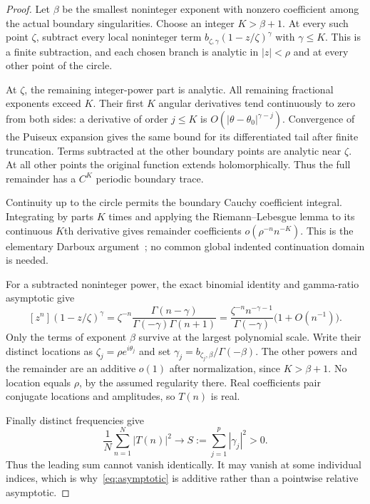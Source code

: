 \documentclass[11pt,a4paper]{article}
\theoremstyle{remark}\newtheorem*{ednote}{Editorial note (ProveIt, 2026-10-01)}
\begin{document}
\begin{proof}
Let $\beta$ be the smallest noninteger exponent with nonzero coefficient among the actual boundary singularities. Choose an integer $K>\beta+1$. At every such point $\zeta$, subtract every local noninteger term
$b_{\zeta,\gamma}(1-z/\zeta)^\gamma$ with $\gamma\le K$. This is a finite subtraction, and each chosen branch is analytic in $|z|<\rho$ and at every other point of the circle.

At $\zeta$, the remaining integer-power part is analytic. All remaining fractional exponents exceed $K$. Their first $K$ angular derivatives tend continuously to zero from both sides: a derivative of order $j\le K$ is $O(|\theta-\theta_0|^{\gamma-j})$. Convergence of the Puiseux expansion gives the same bound for its differentiated tail after finite truncation. Terms subtracted at the other boundary points are analytic near $\zeta$. At all other points the original function extends holomorphically. Thus the full remainder has a $C^K$ periodic boundary trace.

Continuity up to the circle permits the boundary Cauchy coefficient integral. Integrating by parts $K$ times and applying the Riemann--Lebesgue lemma to its continuous $K$th derivative gives remainder coefficients
$o(\rho^{-n}n^{-K})$. This is the elementary Darboux argument~\cite[Theorem VI.11]{FS}; no common global indented continuation domain is needed.

For a subtracted noninteger power, the exact binomial identity and gamma-ratio asymptotic give
\[
 [z^n](1-z/\zeta)^\gamma
 =\zeta^{-n}\frac{\Gamma(n-\gamma)}{\Gamma(-\gamma)\Gamma(n+1)}
 =\frac{\zeta^{-n}n^{-\gamma-1}}{\Gamma(-\gamma)}\bigl(1+O(n^{-1})\bigr).
\]
Only the terms of exponent $\beta$ survive at the largest polynomial scale. Write their distinct locations as $\zeta_j=\rho e^{i\theta_j}$ and set $\gamma_j=b_{\zeta_j,\beta}/\Gamma(-\beta)$. The other powers and the remainder are an additive $o(1)$ after normalization, since $K>\beta+1$. No location equals $\rho$, by the assumed regularity there. Real coefficients pair conjugate locations and amplitudes, so $T(n)$ is real.

Finally distinct frequencies give
\[
 \frac1N\sum_{n=1}^N|T(n)|^2\longrightarrow
 S:=\sum_{j=1}^p|\gamma_j|^2>0.
\]
Thus the leading sum cannot vanish identically. It may vanish at some individual indices, which is why~\eqref{eq:asymptotic} is additive rather than a pointwise relative asymptotic.
\end{proof}
\end{document}
